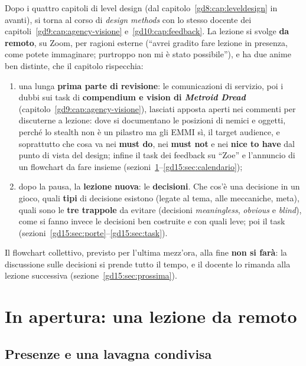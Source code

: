 Dopo i quattro capitoli di level design (dal capitolo~\ref{gd8:cap:leveldesign}
in avanti), si torna al corso di \emph{design methods} con lo stesso docente
dei capitoli~\ref{gd9:cap:agency-visione} e~\ref{gd10:cap:feedback}. La
lezione si svolge \textbf{da remoto}, su Zoom, per ragioni esterne (``avrei
gradito fare lezione in presenza, come potete immaginare; purtroppo non mi è
stato possibile''), e ha due anime ben distinte, che il capitolo rispecchia:
\begin{enumerate}
  \item una lunga \textbf{prima parte di revisione}: le comunicazioni di
        servizio, poi i dubbi sui task di \textbf{compendium e vision di
        \emph{Metroid Dread}} (capitolo~\ref{gd9:cap:agency-visione}),
        lasciati apposta aperti nei commenti per discuterne a lezione: dove
        si documentano le posizioni di nemici e oggetti, perché lo stealth
        non è un pilastro ma gli EMMI sì, il target audience, e soprattutto
        che cosa va nei \textbf{must do}, nei \textbf{must not} e nei
        \textbf{nice to have} dal punto di vista del design; infine il task
        dei feedback su ``Zoe'' e l'annuncio di un flowchart da fare insieme
        (sezioni~\ref{gd15:sec:apertura}--\ref{gd15:sec:calendario});
  \item dopo la pausa, la \textbf{lezione nuova}: le \textbf{decisioni}.
        Che cos'è una decisione in un gioco, quali \textbf{tipi} di
        decisione esistono (legate al tema, alle meccaniche, meta), quali
        sono le \textbf{tre trappole} da evitare (decisioni
        \emph{meaningless}, \emph{obvious} e \emph{blind}), come si fanno
        invece le decisioni ben costruite e con quali leve; poi il task
        (sezioni~\ref{gd15:sec:porte}--\ref{gd15:sec:task}).
\end{enumerate}
Il flowchart collettivo, previsto per l'ultima mezz'ora, alla fine
\textbf{non si farà}: la discussione sulle decisioni si prende tutto il
tempo, e il docente lo rimanda alla lezione successiva
(sezione~\ref{gd15:sec:prossima}).

\section{In apertura: una lezione da remoto}
\label{gd15:sec:apertura}

\subsection{Presenze e una lavagna condivisa}

